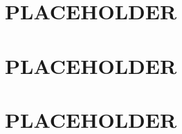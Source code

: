 \documentclass{scrartcl}
\begin{document}
\maketitle

\section{PLACEHOLDER}
\section{PLACEHOLDER}
\section{PLACEHOLDER}
\end{document}
